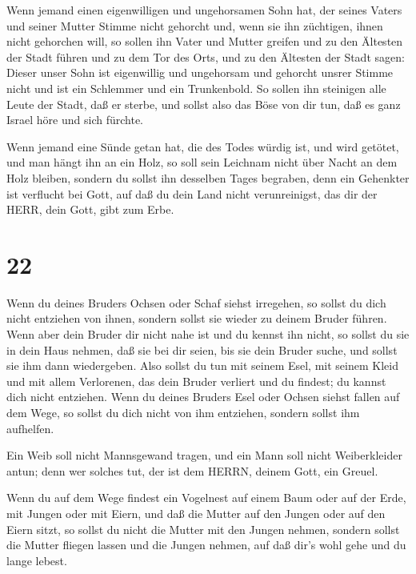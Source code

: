  Wenn jemand einen eigenwilligen und ungehorsamen Sohn hat,
der seines Vaters und seiner Mutter Stimme nicht gehorcht und, wenn sie
ihn züchtigen, ihnen nicht gehorchen will,  so sollen ihn
Vater und Mutter greifen und zu den Ältesten der Stadt führen und zu dem
Tor des Orts,  und zu den Ältesten der Stadt sagen: Dieser
unser Sohn ist eigenwillig und ungehorsam und gehorcht unsrer Stimme
nicht und ist ein Schlemmer und ein Trunkenbold.  So sollen
ihn steinigen alle Leute der Stadt, daß er sterbe, und sollst also das
Böse von dir tun, daß es ganz Israel höre und sich fürchte.

 Wenn jemand eine Sünde getan hat, die des Todes würdig
ist, und wird getötet, und man hängt ihn an ein Holz,  so
soll sein Leichnam nicht über Nacht an dem Holz bleiben, sondern du
sollst ihn desselben Tages begraben, denn ein Gehenkter ist verflucht
bei Gott, auf daß du dein Land nicht verunreinigst, das dir der HERR,
dein Gott, gibt zum Erbe.

\hypertarget{section-21}{%
\section{22}\label{section-21}}

 Wenn du deines Bruders Ochsen oder Schaf siehst irregehen,
so sollst du dich nicht entziehen von ihnen, sondern sollst sie wieder
zu deinem Bruder führen.  Wenn aber dein Bruder dir nicht
nahe ist und du kennst ihn nicht, so sollst du sie in dein Haus nehmen,
daß sie bei dir seien, bis sie dein Bruder suche, und sollst sie ihm
dann wiedergeben.  Also sollst du tun mit seinem Esel, mit
seinem Kleid und mit allem Verlorenen, das dein Bruder verliert und du
findest; du kannst dich nicht entziehen.  Wenn du deines
Bruders Esel oder Ochsen siehst fallen auf dem Wege, so sollst du dich
nicht von ihm entziehen, sondern sollst ihm aufhelfen.

 Ein Weib soll nicht Mannsgewand tragen, und ein Mann soll
nicht Weiberkleider antun; denn wer solches tut, der ist dem HERRN,
deinem Gott, ein Greuel.

 Wenn du auf dem Wege findest ein Vogelnest auf einem Baum
oder auf der Erde, mit Jungen oder mit Eiern, und daß die Mutter auf den
Jungen oder auf den Eiern sitzt, so sollst du nicht die Mutter mit den
Jungen nehmen,  sondern sollst die Mutter fliegen lassen und
die Jungen nehmen, auf daß dir's wohl gehe und du lange lebest.

